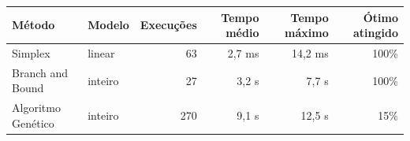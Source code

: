 \begin{tabular}{llrrrr}
\toprule
Método & Modelo & Execuções & Tempo médio & Tempo máximo & Ótimo atingido \\
\midrule
Simplex & linear & 63 & 2{,}7 ms & 14{,}2 ms & 100\% \\
Branch and Bound & inteiro & 27 & 3{,}2 s & 7{,}7 s & 100\% \\
Algoritmo Genético & inteiro & 270 & 9{,}1 s & 12{,}5 s & 15\% \\
\bottomrule
\end{tabular}
